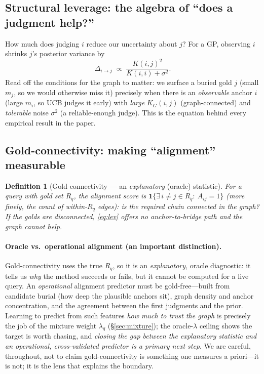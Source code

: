 \documentclass[11pt]{article}
\newtheorem{definition}{Definition}
\begin{document}
\subsection{Structural leverage: the algebra of ``does a judgment help?''}
How much does judging $i$ reduce our uncertainty about $j$? For a GP, observing $i$ shrinks $j$'s posterior
variance by
\begin{equation}\label{eq:lev}
  \Delta_{i\to j} \;\propto\; \frac{K(i,j)^2}{K(i,i)+\sigma^2}.
\end{equation}
Read off the conditions for the graph to matter: we surface a buried gold $j$ (small $m_j$, so we would
otherwise miss it) precisely when there is an \emph{observable} anchor $i$ (large $m_i$, so UCB judges it early)
with \emph{large} $K_G(i,j)$ (graph-connected) and \emph{tolerable} noise $\sigma^2$ (a reliable-enough judge).
This is the equation behind every empirical result in the paper.

\subsection{Gold-connectivity: making ``alignment'' measurable}
\begin{definition}[Gold-connectivity --- an \emph{explanatory} (oracle) statistic]
For a query with gold set $R_q$, the alignment score is $\mathbf 1\{\exists\,i\neq j\in R_q:\ A_{ij}=1\}$
(more finely, the count of within-$R_q$ edges): \emph{is the required chain connected in the graph?} If the
golds are disconnected, \eqref{eq:lev} offers no anchor-to-bridge path and the graph cannot help.
\end{definition}

\paragraph{Oracle vs.\ operational alignment (an important distinction).} Gold-connectivity uses the true
$R_q$, so it is an \emph{explanatory}, oracle diagnostic: it tells us \emph{why} the method succeeds or fails,
but it cannot be computed for a live query. An \emph{operational} alignment predictor must be gold-free---built
from candidate burial (how deep the plausible anchors sit), graph density and anchor concentration, and the
agreement between the first judgments and the prior. Learning to predict from such features \emph{how much to
trust the graph} is precisely the job of the mixture weight $\lambda_q$ (\S\ref{sec:mixture}); the oracle-$\lambda$
ceiling shows the target is worth chasing, and \emph{closing the gap between the explanatory statistic and an
operational, cross-validated predictor is a primary next step}. We are careful, throughout, not to claim
gold-connectivity is something one measures a priori---it is not; it is the lens that explains the boundary.
\end{document}
